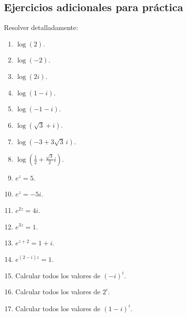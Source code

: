 \documentclass[12pt]{article}
\begin{document}
\subsection*{Ejercicios adicionales para práctica}
Resolver detalladamente:

\begin{enumerate}
\item $\log(2)$.
\item $\log(-2)$.
\item $\log(2i)$.
\item $\log(1-i)$.
\item $\log(-1-i)$.
\item $\log(\sqrt3+i)$.
\item $\log(-3+3\sqrt3\,i)$.
\item $\log\left(\frac12+\frac{\sqrt3}{2}i\right)$.
\item $e^z=5$.
\item $e^z=-5i$.
\item $e^{2z}=4i$.
\item $e^{3z}=1$.
\item $e^{z+2}=1+i$.
\item $e^{(2-i)z}=1$.
\item Calcular todos los valores de $(-i)^i$.
\item Calcular todos los valores de $2^i$.
\item Calcular todos los valores de $(1-i)^i$.
\end{enumerate}
\end{document}

